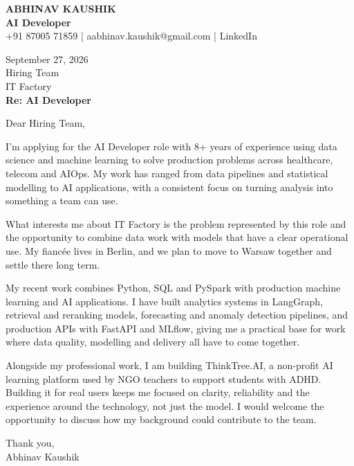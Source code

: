 \documentclass[10pt,a4paper]{article}
\begin{document}
\begin{center}
{\Large\bfseries ABHINAV KAUSHIK}\\[2pt]
{\bfseries AI Developer}\\[2pt]
+91 87005 71859 \quad | \quad aabhinav.kaushik@gmail.com \quad | \quad LinkedIn
\end{center}
\vspace{8pt}
September 27, 2026\\[6pt]
Hiring Team\\
IT Factory\\[4pt]
\textbf{Re: AI Developer}

Dear Hiring Team,

I’m applying for the AI Developer role with 8+ years of experience using data science and machine learning to solve production problems across healthcare, telecom and AIOps. My work has ranged from data pipelines and statistical modelling to AI applications, with a consistent focus on turning analysis into something a team can use.

What interests me about IT Factory is the problem represented by this role and the opportunity to combine data work with models that have a clear operational use. My fiancée lives in Berlin, and we plan to move to Warsaw together and settle there long term.

My recent work combines Python, SQL and PySpark with production machine learning and AI applications. I have built analytics systems in LangGraph, retrieval and reranking models, forecasting and anomaly detection pipelines, and production APIs with FastAPI and MLflow, giving me a practical base for work where data quality, modelling and delivery all have to come together.

Alongside my professional work, I am building ThinkTree.AI, a non-profit AI learning platform used by NGO teachers to support students with ADHD. Building it for real users keeps me focused on clarity, reliability and the experience around the technology, not just the model. I would welcome the opportunity to discuss how my background could contribute to the team.

Thank you,\\
Abhinav Kaushik
\end{document}
